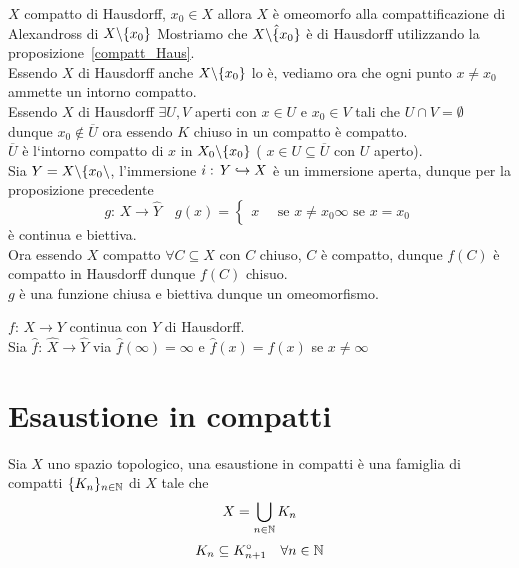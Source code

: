 \spazio
\begin{cor}$X$ compatto di Hausdorff, $x_0\in X$  allora  $X$ \`e omeomorfo alla compattificazione di Alexandross di $X \backslash \{ x_0\}$
\proof Mostriamo che $\hat{X\backslash \{ x_0\}}$ \`e di Hausdorff utilizzando la proposizione~\ref{compatt_Haus}.\\
Essendo $X$ di Hausdorff anche $X\backslash \{ x_0\} $ lo \`e, vediamo ora che ogni punto $x\neq x_0$ ammette un intorno compatto.\\
Essendo $X$ di Hausdorff $\exists U, V $ aperti con $x \in U $ e $x_0 \in V$ tali che $U \cap V = \emptyset$ dunque $x_0 \not \in \overline{U} $  ora essendo $K$ chiuso in un compatto \`e compatto.\\
$\overline{U}$ \`e l`intorno compatto di $x$ in $X_0 \backslash \{x_0\}$ ( $x\in U \subseteq \overline{U}$ con $U$ aperto).\\

Sia  $Y=X\backslash \{ x_0 \backslash$, l'immersione $i:\, Y \hookrightarrow X$ \`e un immersione aperta, dunque per la proposizione precedente
$$ g:\, X \to \hat{Y} \quad g(x) =\begin{cases}
                                   x \quad \text{ se } x \neq x_0
                                   \infty \text{ se } x = x_0
                                  \end{cases}$$
\`e continua e biettiva.\\
Ora essendo $X$ compatto $\forall C \subseteq X$ con $C$ chiuso, $C$ \`e compatto, dunque $f(C)$ \`e compatto in Hausdorff dunque $f(C)$ chisuo.\\
$g$ \`e una funzione chiusa e biettiva dunque un omeomorfismo.
\endproof
\end{cor}
\begin{ex}$f:\, X \to Y$ continua con $Y$ di Hausdorff.\\
Sia $\hat{f}:\, \hat{X} \to \hat{Y}$ via $\hat{f}(\infty)=\infty$ e $\hat{f}(x)=f(x)$ se $x \neq \infty$
\end{ex}
\newpage
\section{Esaustione in compatti}
\begin{defn}
 Sia $X$ uno spazio topologico, una esaustione in compatti \`e una famiglia di compatti $\displaystyle \{ K_n\}_{n \in \mathbb{N}}$ di $X$ tale che 
 $$ X = \bigcup_{n \in \mathbb{N}} K_n$$
 $$ K_n \subseteq K_{n+1}^\circ \quad \forall n \in \mathbb{N}$$
\end{defn}

